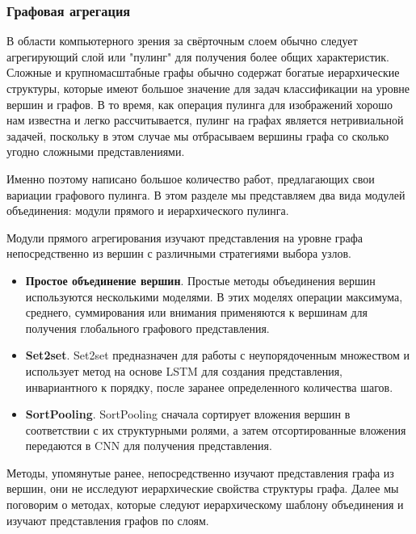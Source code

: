 \documentclass[12pt]{article}
\begin{document}
\subsubsection{Графовая агрегация}

В области компьютерного зрения за свёрточным слоем обычно следует агрегирующий слой или "пулинг" для получения более общих характеристик. Сложные и крупномасштабные графы обычно содержат богатые иерархические структуры, которые имеют большое значение для задач классификации на уровне вершин и графов. В то время, как операция пулинга для изображений хорошо нам известна и легко рассчитывается, пулинг на графах является нетривиальной задачей, поскольку в этом случае мы отбрасываем вершины графа со сколько угодно сложными представлениями.

Именно поэтому написано большое количество работ, предлагающих свои вариации графового пулинга. В этом разделе мы представляем два вида модулей объединения: модули прямого и иерархического пулинга.

Модули прямого агрегирования изучают представления на уровне графа непосредственно из вершин с различными стратегиями выбора узлов.

\begin{itemize}
    \item \textbf{Простое объединение вершин}. Простые методы объединения вершин используются несколькими моделями. В этих моделях операции максимума, среднего, суммирования или внимания применяются к вершинам для получения глобального графового представления. 
    
    \item \textbf{Set2set}. Set2set \cite{vinyals2015order} предназначен для работы с неупорядоченным множеством и использует метод на основе LSTM для создания представления, инвариантного к порядку, после заранее определенного количества шагов.
    
    \item \textbf{SortPooling}. SortPooling \cite{zhang2018end} сначала сортирует вложения вершин в соответствии с их структурными ролями, а затем отсортированные вложения передаются в CNN для получения представления.
\end{itemize}

Методы, упомянутые ранее, непосредственно изучают представления графа из вершин, они не исследуют иерархические свойства структуры графа. Далее мы поговорим о методах, которые следуют иерархическому шаблону объединения и изучают представления графов по слоям.
\end{document}
